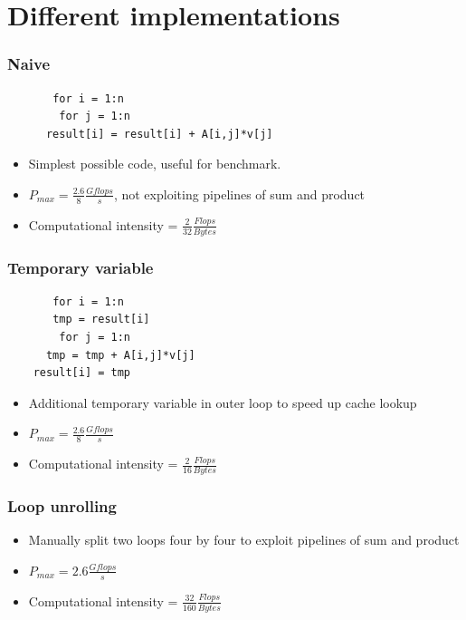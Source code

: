 \documentclass{beamer}
\begin{document}
\section{Different implementations}
\begin{frame}[fragile]
\frametitle{Naive}
\begin{center}
\begin{lstlisting}
       for i = 1:n
       	for j = 1:n 
	  result[i] = result[i] + A[i,j]*v[j]
\end{lstlisting}
\end{center}
\begin{itemize}
\item  Simplest possible code, useful for benchmark.
\item  $P_{max} = \frac{2.6}{8}\frac{Gflops}{s}$, not exploiting pipelines of sum and product
\item  Computational intensity = $\frac{2}{32}\frac{Flops}{Bytes}$
\end{itemize}
\end{frame}

\begin{frame}[fragile]
\frametitle{Temporary variable}
\begin{center}
\begin{lstlisting}
       for i = 1:n
       tmp = result[i]
       	for j = 1:n 
	  tmp = tmp + A[i,j]*v[j]
	result[i] = tmp
\end{lstlisting}
\end{center}
\begin{itemize}
\item Additional temporary variable in outer loop to speed up cache lookup
\item  $P_{max} = \frac{2.6}{8}\frac{Gflops}{s}$
\item Computational intensity = $\frac{2}{16}\frac{Flops}{Bytes}$
\end{itemize}
\end{frame}

\begin{frame}
\frametitle{Loop unrolling}
\begin{itemize}
\item Manually split two loops four by four to exploit pipelines of sum and product
\item $P_{max} =2.6\frac{Gflops}{s}$ 
\item Computational intensity = $\frac{32}{160}\frac{Flops}{Bytes}$
\end{itemize}
\end{frame}
\end{document}
